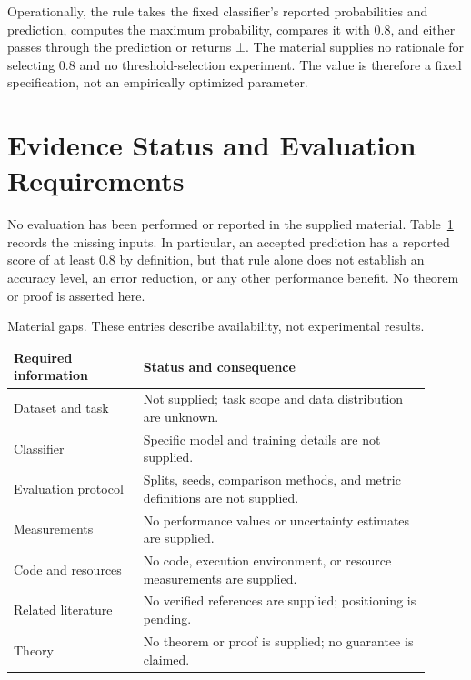 Operationally, the rule takes the fixed classifier's reported probabilities and
prediction, computes the maximum probability, compares it with $0.8$, and either
passes through the prediction or returns $\bot$. The material supplies no
rationale for selecting $0.8$ and no threshold-selection experiment. The value
is therefore a fixed specification, not an empirically optimized parameter.

\section{Evidence Status and Evaluation Requirements}
\label{sec:evidence}
No evaluation has been performed or reported in the supplied material.
Table~\ref{tab:gaps} records the missing inputs. In particular, an accepted
prediction has a reported score of at least $0.8$ by definition, but that rule
alone does not establish an accuracy level, an error reduction, or any other
performance benefit. No theorem or proof is asserted here.

\begin{table}[ht]
\centering
\caption{Material gaps. These entries describe availability, not experimental results.}
\label{tab:gaps}
\begin{tabular}{p{0.29\linewidth}p{0.62\linewidth}}
\hline
Required information & Status and consequence\\
\hline
Dataset and task & Not supplied; task scope and data distribution are unknown.\\
Classifier & Specific model and training details are not supplied.\\
Evaluation protocol & Splits, seeds, comparison methods, and metric definitions are not supplied.\\
Measurements & No performance values or uncertainty estimates are supplied.\\
Code and resources & No code, execution environment, or resource measurements are supplied.\\
Related literature & No verified references are supplied; positioning is pending.\\
Theory & No theorem or proof is supplied; no guarantee is claimed.\\
\hline
\end{tabular}
\end{table}

